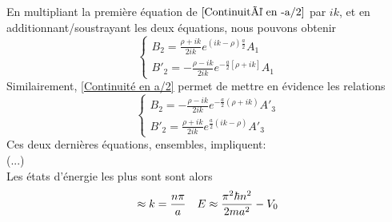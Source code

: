 \documentclass[../notesdecours]{subfiles}
\begin{document}
En multipliant la première équation de $\eqref{Continuité en -a/2}$ par $ik$, et en additionnant/soustrayant les deux équations, nous pouvons obtenir
\begin{equation}
\begin{cases}
B_2 = \frac{\rho + ik}{2ik}e^{\left(ik-\rho\right)\frac{a}{2}}A_1\\
B'_2 = -\frac{\rho-ik}{2ik} e^{-\frac{a}{2}\left[\rho+ik\right]}A_1
\end{cases}
\end{equation}
Similairement, \eqref{Continuité en a/2} permet de mettre en évidence les relations
\begin{equation}
\begin{cases}
B_2 = -\frac{\rho-ik}{2ik}e^{-\frac{a}{2}\left(\rho+ik\right)}A'_3\\
B'_2 = \frac{\rho+ik}{2ik}e^{\frac{a}{2}\left(ik-\rho\right)}A'_3
\end{cases}
\end{equation}
Ces deux dernières équations, ensembles, impliquent:\\

(...)\\

Les états d'énergie les plus sont sont alors
\begin{align}
\approx k &= \frac{n\pi}{a}		&E \approx \frac{\pi^2\hbar n^2}{2ma^2} - V_0
\end{align}
\end{document}
